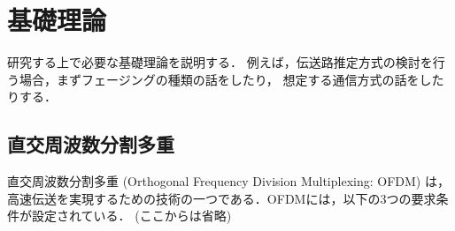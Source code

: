 \section{基礎理論}
\label{sec:fundamental_theory}
研究する上で必要な基礎理論を説明する．
例えば，伝送路推定方式の検討を行う場合，まずフェージングの種類の話をしたり，
想定する通信方式の話をしたりする．
\subsection{直交周波数分割多重}
直交周波数分割多重 (Orthogonal Frequency Division Multiplexing: OFDM) は，高速伝送を実現するための技術の一つである．OFDMには，以下の3つの要求条件が設定されている\cite{5gtextbook}． (ここからは省略)